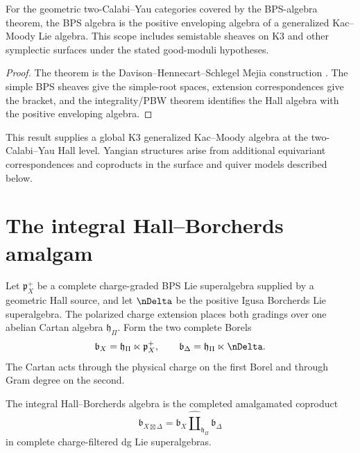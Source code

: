 \begin{theorem}
For the geometric two-Calabi--Yau categories covered by the BPS-algebra theorem, the BPS algebra is the positive enveloping algebra of a generalized Kac--Moody Lie algebra. This scope includes semistable sheaves on K3 and other symplectic surfaces under the stated good-moduli hypotheses.
\end{theorem}
\begin{proof}
The theorem is the Davison--Hennecart--Schlegel Mejia construction \cite{DHS}. The simple BPS sheaves give the simple-root spaces, extension correspondences give the bracket, and the integrality/PBW theorem identifies the Hall algebra with the positive enveloping algebra.
\end{proof}

This result supplies a global K3 generalized Kac--Moody algebra at the two-Calabi--Yau Hall level. Yangian structures arise from additional equivariant correspondences and coproducts in the surface and quiver models described below.

\chapter{The integral Hall--Borcherds amalgam}
Let $\mathfrak p_X^+$ be a complete charge-graded BPS Lie superalgebra supplied by a geometric Hall source, and let $\nDelta$ be the positive Igusa Borcherds Lie superalgebra.  The polarized charge extension places both gradings over one abelian Cartan algebra $\mathfrak h_\Pi$.  Form the two complete Borels
\[
 \mathfrak b_X=\mathfrak h_\Pi\ltimes\mathfrak p_X^+,
 \qquad
 \mathfrak b_\Delta=\mathfrak h_\Pi\ltimes\nDelta.
\]
The Cartan acts through the physical charge on the first Borel and through Gram degree on the second.

\begin{definition}
The integral Hall--Borcherds algebra is the completed amalgamated coproduct
\[
 \mathfrak b_{X\boxtimes\Delta}
 =\mathfrak b_X
  \widehat\amalg_{\mathfrak h_\Pi}
  \mathfrak b_\Delta
\]
in complete charge-filtered dg Lie superalgebras.
\end{definition}

